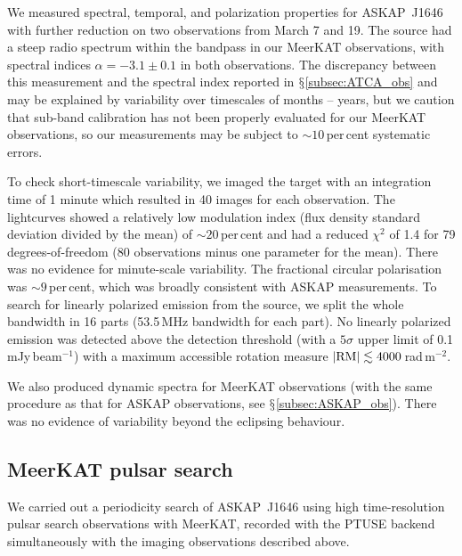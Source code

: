 \documentclass[fleqn,usenatbib]{mnras}
\newcommand{\blinkyaskap}{{ASKAP}~J1646}
\begin{document}
We measured spectral, temporal, and polarization properties for \blinkyaskap{} with further reduction on two observations from March 7 and 19. 
The source had a steep radio spectrum within the bandpass in our MeerKAT observations, with spectral indices $\alpha=-3.1\pm0.1$ in both observations. The discrepancy between this measurement and the spectral index reported in $\mathsection$\ref{subsec:ATCA_obs} and \citet{2018MNRAS.475..942F} may be explained by variability over timescales of months -- years, but we caution that sub-band calibration has not been properly evaluated for our MeerKAT observations, so our measurements may be subject to $\sim 10$\,per\,cent systematic errors. 

To check short-timescale variability, we imaged the target with an integration time of 1 minute which resulted in 40 images for each observation. The lightcurves showed a relatively low modulation index (flux density standard deviation divided by the mean) of $\sim20$\,per\,cent and had a reduced $\chi^2$ of 1.4 for 79 degrees-of-freedom (80 observations minus one parameter for the mean). There was no evidence for minute-scale variability.
The fractional circular polarisation was $\sim9$\,per\,cent, which was broadly consistent with ASKAP measurements.
To search for linearly polarized emission from the source, we split the whole bandwidth in 16 parts (53.5\,MHz bandwidth for each part). No linearly polarized emission was detected above the detection threshold (with a $5\sigma$ upper limit of 0.1\,mJy\,beam$^{-1}$) with a maximum accessible rotation measure $\vert{\rm RM}\vert \lesssim 4000$\,rad\,m$^{-2}$.

We also produced dynamic spectra for MeerKAT observations (with the same procedure as that for ASKAP observations, see $\mathsection$\ref{subsec:ASKAP_obs}). 
There was no evidence of variability beyond the eclipsing behaviour. 




\subsection{MeerKAT pulsar search}
\label{subsec:mkt_psrsearch}
We carried out a periodicity search of \blinkyaskap{} using high time-resolution pulsar search observations with MeerKAT, recorded with the PTUSE backend simultaneously with the imaging observations described above.
\end{document}
